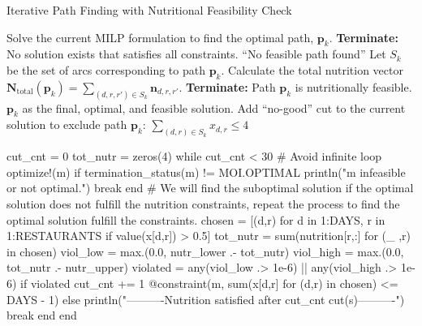 \documentclass{article}
\begin{document}
\begin{algorithm}[h]
\caption{Iterative Path Finding with Nutritional Feasibility Check}
\label{alg:iterative_path_finding}
\begin{algorithmic}[1]%
    \State Solve the current MILP formulation to find the optimal path, $\mathbf{p}_k$.
        \State \textbf{Terminate:} No solution exists that satisfies all constraints.
        \State \Return ``No feasible path found''
    \EndIf
    \State Let $S_k$ be the set of arcs corresponding to path $\mathbf{p}_k$.
    \State Calculate the total nutrition vector $\mathbf{N}_{\text{total}}(\mathbf{p}_k) = \sum_{(d,r,r') \in S_k} \mathbf{n}_{d,r,r'}$.
        \State \textbf{Terminate:} Path $\mathbf{p}_k$ is nutritionally feasible.
        \State \Return $\mathbf{p}_k$ as the final, optimal, and feasible solution.
    \Else
        \State Add ``no-good'' cut to the current solution to exclude path $\mathbf{p}_k$:
         $\displaystyle\sum_{(d,r) \in S_k} x_{d,r} \le 4$
        \State {}
    \EndIf
\EndWhile
\end{algorithmic}
\end{algorithm}




\begin{shadowminted}
    cut_cnt   = 0
tot_nutr  = zeros(4)
while cut_cnt < 30 # Avoid infinite loop
    optimize!(m)
    if termination_status(m) != MOI.OPTIMAL
        println("m infeasible or not optimal.")
        break
    end
    # We will find the suboptimal solution if the optimal solution does not fulfill the nutrition constraints, repeat the process to find the optimal solution fulfill the constraints.
    chosen = [(d,r) for d in 1:DAYS, r in 1:RESTAURANTS if value(x[d,r]) > 0.5]
    tot_nutr = sum(nutrition[r,:] for (_ ,r) in chosen)
    viol_low  = max.(0.0, nutr_lower .- tot_nutr)
    viol_high = max.(0.0, tot_nutr .- nutr_upper)
    violated  = any(viol_low  .> 1e-6) || any(viol_high .> 1e-6)
    if violated
        cut_cnt += 1
        @constraint(m, sum(x[d,r] for (d,r) in chosen) <= DAYS - 1)
    else
        println("----------Nutrition satisfied after cut_cnt cut(s)----------")
        break
    end
end
\end{shadowminted}
\end{document}
